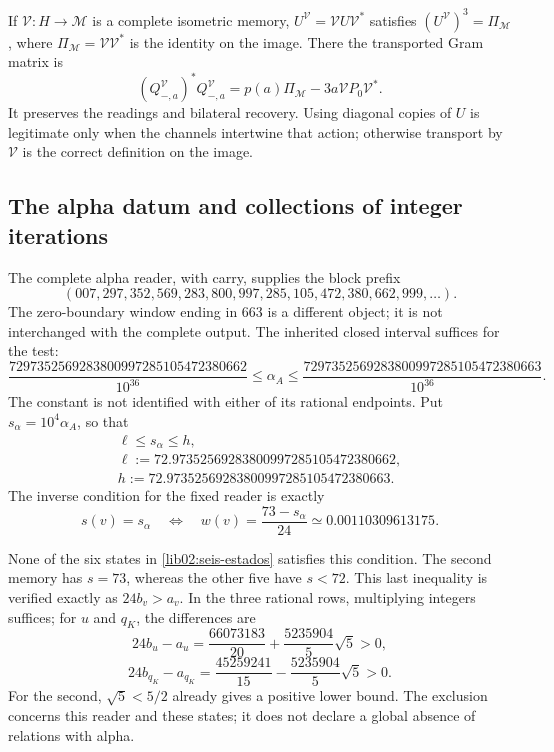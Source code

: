 If \(\mathcal V:H\to\mathcal M\) is a complete isometric memory, \(U^{\mathcal V}=\mathcal VU\mathcal V^*\) satisfies \((U^{\mathcal V})^3=\Pi_{\mathcal M}\), where \(\Pi_{\mathcal M}=\mathcal V\mathcal V^*\) is the identity on the image. There the transported Gram matrix is
\[
 (Q_{-,a}^{\mathcal V})^*Q_{-,a}^{\mathcal V}
 =p(a)\Pi_{\mathcal M}-3a\mathcal VP_0\mathcal V^*.
\]
It preserves the readings and bilateral recovery. Using diagonal copies of \(U\) is legitimate only when the channels intertwine that action; otherwise transport by \(\mathcal V\) is the correct definition on the image.

\subsection{The alpha datum and collections of integer iterations}
\label{lib02:ensayo-inverso}

The complete alpha reader, with carry, supplies the block prefix
\[
 (007,297,352,569,283,800,997,285,105,472,380,662,999,\ldots).
\]
The zero-boundary window ending in 663 is a different object; it is not interchanged with the complete output. The inherited closed interval suffices for the test:
\begin{equation}
 \frac{7297352569283800997285105472380662}{10^{36}}
 \leq\alpha_A\leq
 \frac{7297352569283800997285105472380663}{10^{36}}.
 \label{lib02:intervalo-alpha}
\end{equation}
The constant is not identified with either of its rational endpoints. Put \(s_\alpha=10^4\alpha_A\), so that
\begin{equation}
 \begin{gathered}
 \ell\leq s_\alpha\leq h,\\
 \ell:=72.97352569283800997285105472380662,\\
 h:=72.97352569283800997285105472380663.
 \end{gathered}
 \label{lib02:intervalo-s}
\end{equation}
The inverse condition for the fixed reader is exactly
\begin{equation}
 s(v)=s_\alpha
 \quad\Longleftrightarrow\quad
 w(v)=\frac{73-s_\alpha}{24}
 \simeq0.00110309613175.
 \label{lib02:criterio-alpha}
\end{equation}

None of the six states in \cref{lib02:seis-estados} satisfies this condition. The second memory has \(s=73\), whereas the other five have \(s<72\). This last inequality is verified exactly as \(24b_v>a_v\). In the three rational rows, multiplying integers suffices; for \(u\) and \(q_K\), the differences are
\[
 24b_u-a_u=\frac{66073183}{20}+\frac{5235904}{5}\sqrt5>0,
\]
\[
 24b_{q_K}-a_{q_K}
 =\frac{45259241}{15}-\frac{5235904}{5}\sqrt5>0.
\]
For the second, \(\sqrt5<5/2\) already gives a positive lower bound. The exclusion concerns this reader and these states; it does not declare a global absence of relations with alpha.

